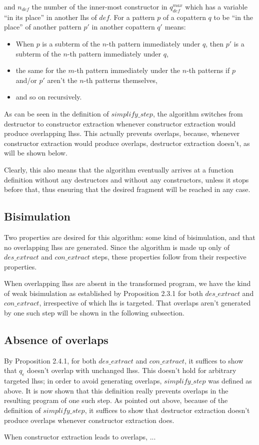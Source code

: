 and $n_{def}$ the number of the inner-most constructor in $q^{max}_{def}$ which has a variable ``in its place'' in another lhs of $def$. For a pattern $p$ of a copattern $q$ to be ``in the place'' of another pattern $p'$ in another copattern $q'$ means:
\begin{itemize}
\item When $p$ is a subterm of the $n$-th pattern immediately under $q$, then $p'$ is a subterm of the $n$-th pattern immediately under $q$,

\item the same for the $m$-th pattern immediately under the $n$-th patterns if $p$ and/or $p'$ aren't the $n$-th patterns themselves,

\item and so on recursively.
\end{itemize}

As can be seen in the definition of $simplify\_step$, the algorithm switches from destructor to constructor extraction whenever constructor extraction would produce overlapping lhss. This actually prevents overlaps, because, whenever constructor extraction would produce overlaps, destructor extraction doesn't, as will be shown below.

Clearly, this also means that the algorithm eventually arrives at a function definition without any destructors and without any constructors, unless it stops before that, thus ensuring that the desired fragment will be reached in any case.

\subsection{Bisimulation}

Two properties are desired for this algorithm: some kind of bisimulation, and that no overlapping lhss are generated. Since the algorithm is made up only of $des\_extract$ and $con\_extract$ steps, these properties follow from their respective properties.

When overlapping lhss are absent in the transformed program, we have the kind of weak bisimulation as established by Proposition 2.3.1 for both $des\_extract$ and $con\_extract$, irrespective of which lhs is targeted. That overlaps aren't generated by one such step will be shown in the following subsection.

\subsection{Absence of overlaps}

By Proposition 2.4.1, for both $des\_extract$ and $con\_extract$, it suffices to show that $q_\epsilon$ doesn't overlap with unchanged lhss. This doesn't hold for arbitrary targeted lhss; in order to avoid generating overlaps, $simplify\_step$ was defined as above. It is now shown that this definition really prevents overlaps in the resulting program of one such step. As pointed out above, because of the definition of $simplify\_step$, it suffices to show that destructor extraction doesn't produce overlaps whenever constructor extraction does.

When constructor extraction leads to overlaps, ...
